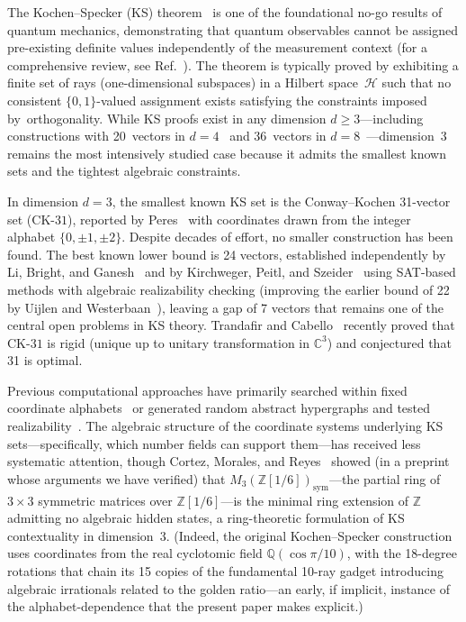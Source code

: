 \documentclass[12pt,a4paper]{article}
\newcommand{\C}{\mathbb{C}}
\newcommand{\Z}{\mathbb{Z}}
\newcommand{\CK}{\mathrm{CK}\text{-}31}
\begin{document}
The Kochen--Specker (KS) theorem~\cite{KochenSpecker1967} is one of the foundational no-go results of quantum mechanics, demonstrating that quantum observables cannot be assigned pre-existing definite values independently of the measurement context (for a comprehensive review, see Ref.~\cite{Budroni2022}). The theorem is typically proved by exhibiting a finite set of rays (one-dimensional subspaces) in a Hilbert space~$\mathcal{H}$ such that no consistent $\{0,1\}$-valued assignment exists satisfying the constraints imposed by~orthogonality.  While KS proofs exist in any dimension $d \geq 3$---including constructions with 20~vectors in $d = 4$~\cite{Kernaghan1994} and 36~vectors in $d = 8$~\cite{KernaghanPeres1995}---dimension~3 remains the most intensively studied case because it admits the smallest known sets and the tightest algebraic constraints.

In dimension $d = 3$, the smallest known KS set is the Conway--Kochen 31-vector set ($\CK$), reported by Peres~\cite{Peres1993} with coordinates drawn from the integer alphabet $\{0, \pm 1, \pm 2\}$. Despite decades of effort, no smaller construction has been found. The best known lower bound is 24 vectors, established independently by Li, Bright, and Ganesh~\cite{LiBrightGanesh2024} and by Kirchweger, Peitl, and Szeider~\cite{KirchwegarPeitlSzeider2023} using SAT-based methods with algebraic realizability checking (improving the earlier bound of 22 by Uijlen and Westerbaan~\cite{UijlenWesterbaan2016}), leaving a gap of 7 vectors that remains one of the central open problems in KS theory. Trandafir and Cabello~\cite{TrandafirCabello2025} recently proved that $\CK$ is rigid (unique up to unitary transformation in $\C^3$) and conjectured that 31 is optimal.

Previous computational approaches have primarily searched within fixed coordinate alphabets~\cite{Peres1991, Pavicic2004} or generated random abstract hypergraphs and tested realizability~\cite{LiBrightGanesh2024}. The algebraic structure of the coordinate systems underlying KS sets---specifically, which number fields can support them---has received less systematic attention, though Cortez, Morales, and Reyes~\cite{CortezMoralesReyes2022} showed (in a preprint whose arguments we have verified) that $M_3(\Z[1/6])_{\mathrm{sym}}$---the partial ring of $3 \times 3$ symmetric matrices over $\Z[1/6]$---is the minimal ring extension of $\Z$ admitting no algebraic hidden states, a ring-theoretic formulation of KS contextuality in dimension~3. (Indeed, the original Kochen--Specker construction~\cite{KochenSpecker1967} uses coordinates from the real cyclotomic field $\mathbb{Q}(\cos\pi/10)$, with the 18-degree rotations that chain its 15 copies of the fundamental 10-ray gadget introducing algebraic irrationals related to the golden ratio---an early, if implicit, instance of the alphabet-dependence that the present paper makes explicit.)
\end{document}

